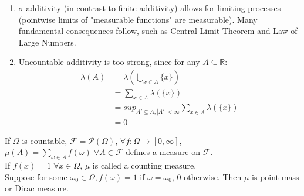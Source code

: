 \documentclass{article}
\begin{document}
	\begin{myrem}{}{}
		\begin{enumerate}
			\item $\sigma$-additivity (in contrast to finite additivity) allows for limiting processes (pointwise limits of "measurable functions" are measurable). Many fundamental consequences follow, such as Central Limit Theorem and Law of Large Numbers.
			\item Uncountable additivity is too strong, since for any $A\subseteq \mathbb{R}$:
			\begin{align*}
				\lambda(A)&=\lambda(\bigcup_{x\in A}\{x\})\\
				&=\sum_{x\in A}\lambda(\{x\})\\
				&=sup_{A'\subseteq A, |A'|<\infty}\sum_{x\in A}\lambda(\{x\})\\
				&=0
			\end{align*}
		\end{enumerate}
	\end{myrem}
	
	\begin{myex}{}{}
		If $\Omega$ is countable, $\mathcal{F}=\mathcal{P}(\Omega)$, $\forall f : \Omega\rightarrow[0, \infty]$, $\mu(A)=\sum_{\omega\in A}f(\omega)\;\forall A\in\mathcal{F}$ defines a measure on $\mathcal{F}$.\\
		
		If $f(x)=1\;\forall x\in\Omega$, $\mu$ is called a counting measure.\\
		
		Suppose for some $\omega_0\in\Omega, f(\omega)=1$ if $\omega=\omega_0$, $0$ otherwise. Then $\mu$ is point mass or Dirac measure.
	\end{myex}
	
\end{document}

